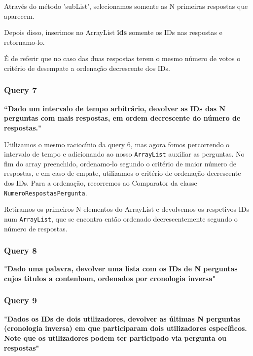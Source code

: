 \documentclass[a4paper]{article}
\begin{document}
Através do método 'subList', selecionamos somente as N primeiras respostas
que aparecem.

Depois disso, inserimos no ArrayList \textbf{ids} somente os
IDs nas respostas e retornamo-lo.

É de referir que no caso das duas respostas terem o mesmo número
de votos o critério de desempate a ordenação decrescente dos IDs.



\subsubsection*{Query 7}
\label{sec:query7}

\textbf{“Dado um intervalo de tempo arbitrário, devolver as IDs das N perguntas
com mais respostas, em ordem decrescente do número de respostas."}

\vspace{0.1cm}

Utilizamos o mesmo raciocínio da query 6, mas agora fomos percorrendo o intervalo
de tempo e adicionando ao nosso \texttt{ArrayList} auxiliar as perguntas.
No fim do array preenchido, ordenamo-lo segundo o critério de maior número
de respostas, e em caso de empate, utilizamos o critério de ordenação decrescente dos IDs.
Para a ordenação, recorremos ao Comparator da classe \texttt{NumeroRespostasPergunta}.

Retiramos os primeiros N elementos do ArrayList e devolvemos os respetivos IDs
num \texttt{ArrayList}, que se encontra então ordenado
decrescentemente segundo o número de respostas.



\subsubsection*{Query 8}
\label{sec:query8}

\textbf{"Dado uma palavra, devolver uma lista com os IDs de
N perguntas cujos títulos a contenham, ordenados por cronologia inversa"}

\vspace{0.1cm}



\subsubsection*{Query 9}
\label{sec:query9}

\textbf{"Dados os IDs de dois utilizadores, devolver as últimas
N perguntas (cronologia inversa) em que participaram dois utilizadores específicos.
Note que os utilizadores podem ter participado via pergunta ou respostas"}
\end{document}
